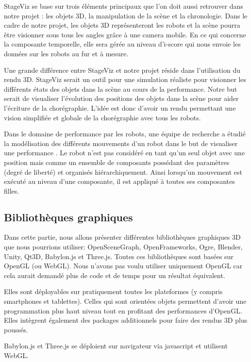 StageViz se base sur trois éléments principaux que l'on doit aussi retrouver dans notre projet : les objets 3D, la manipulation de la scène et la chronologie. Dans le cadre de notre projet, les objets 3D représenteront les robots et la scène pourra être visionner sous tous les angles grâce à une camera mobile. En ce qui concerne la composante temporelle, elle sera gérée au niveau d'i-score qui nous envoie les données sur les robots au fur et à mesure. 

Une grande différence entre StageViz et notre projet réside dans l'utilisation du rendu 3D. StageViz serait un outil pour une simulation réaliste pour visionner les différents états des objets dans la scène au cours de la performance. Notre but serait de visualiser l'évolution des positions des objets dans la scène pour aider l'écriture de la chorégraphie. L'idée est donc d'avoir un rendu permettant une vision simplifiée et globale de la chorégraphie avec tous les robots.

Dans le domaine de performance par les robots, une équipe de recherche a étudié la modélisation des différents mouvements d'un robot dans le but de visualiser une performance \cite{robotArt}. Le robot n'est pas considéré en tant qu'un seul objet avec une position mais comme un ensemble de composants possédant des paramètres (degré de liberté) et organisés hiérarchiquement. Ainsi lorsqu'un mouvement est exécuté au niveau d'une composante, il est appliqué à toutes ses composantes filles.


\subsection{Bibliothèques graphiques}
Dans cette partie, nous allons présenter différentes bibliothèques graphiques 3D que nous pourrions utiliser: OpenSceneGraph, OpenFrameworks, Ogre, Blender, Unity, Qt3D, Babylon.js et Three.js. Toutes ces bibliothèques sont basées sur OpenGL (ou WebGL). Nous n'avons pas voulu utiliser uniquement OpenGL car cela aurait demandé plus de code et de temps pour un résultat équivalent. 

Elles sont déployables sur pratiquement toutes les plateformes (y compris smartphones et tablettes). Celles qui sont orientées objets permettent d'avoir une programmation plus haut niveau tout en profitant des performances d'OpenGL. Elles intègrent également des packages additionnels pour faire des rendus 3D plus poussés. 

Babylon.js et Three.js se déploient sur navigateur via javascript et utilisent WebGL.


